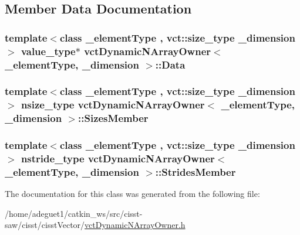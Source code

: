 \subsection{Member Data Documentation}
\hypertarget{classvct_dynamic_n_array_owner_a8b99109f919dd5b01605368e2eb06ca4}{
\subsubsection[{Data}]{\setlength{\rightskip}{0pt plus 5cm}template$<$class \-\_\-element\-Type , vct\-::size\-\_\-type \-\_\-dimension$>$ value\-\_\-type$\ast$ {\bf vct\-Dynamic\-N\-Array\-Owner}$<$ \-\_\-element\-Type, \-\_\-dimension $>$\-::Data\hspace{0.3cm}{\ttfamily [protected]}}}\label{classvct_dynamic_n_array_owner_a8b99109f919dd5b01605368e2eb06ca4}
\hypertarget{classvct_dynamic_n_array_owner_af107a6047ac88e19634d12fbd93e6267}{
\subsubsection[{Sizes\-Member}]{\setlength{\rightskip}{0pt plus 5cm}template$<$class \-\_\-element\-Type , vct\-::size\-\_\-type \-\_\-dimension$>$ nsize\-\_\-type {\bf vct\-Dynamic\-N\-Array\-Owner}$<$ \-\_\-element\-Type, \-\_\-dimension $>$\-::Sizes\-Member\hspace{0.3cm}{\ttfamily [protected]}}}\label{classvct_dynamic_n_array_owner_af107a6047ac88e19634d12fbd93e6267}
\hypertarget{classvct_dynamic_n_array_owner_a7a9e21f0f52c3ca29da81f404eaaafcb}{
\subsubsection[{Strides\-Member}]{\setlength{\rightskip}{0pt plus 5cm}template$<$class \-\_\-element\-Type , vct\-::size\-\_\-type \-\_\-dimension$>$ nstride\-\_\-type {\bf vct\-Dynamic\-N\-Array\-Owner}$<$ \-\_\-element\-Type, \-\_\-dimension $>$\-::Strides\-Member\hspace{0.3cm}{\ttfamily [protected]}}}\label{classvct_dynamic_n_array_owner_a7a9e21f0f52c3ca29da81f404eaaafcb}


The documentation for this class was generated from the following file\-:\begin{DoxyCompactItemize}
\item 
/home/adeguet1/catkin\-\_\-ws/src/cisst-\/saw/cisst/cisst\-Vector/\hyperlink{vct_dynamic_n_array_owner_8h}{vct\-Dynamic\-N\-Array\-Owner.\-h}\end{DoxyCompactItemize}
